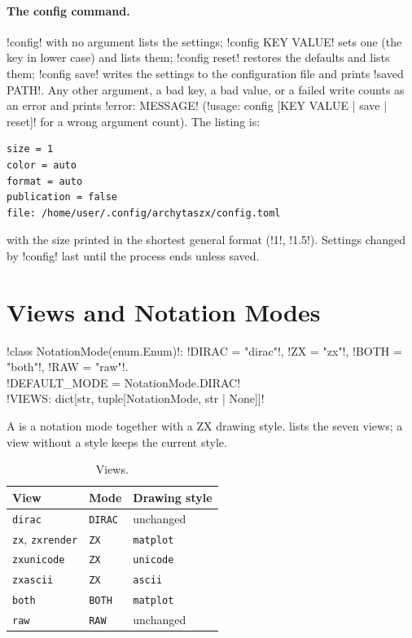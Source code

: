 \paragraph{The config command.} \azx!config! with no argument lists the settings; \azx!config KEY VALUE! sets one (the key in lower case) and lists them; \azx!config reset! restores the defaults and lists them; \azx!config save! writes the settings to the configuration file and prints \code!saved PATH!. Any other argument, a bad key, a bad value, or a failed write counts as an error and prints \code!error: MESSAGE! (\code!usage: config [KEY VALUE | save | reset]! for a wrong argument count). The listing is:
\begin{lstlisting}[style=grammar]
size = 1
color = auto
format = auto
publication = false
file: /home/user/.config/archytaszx/config.toml
\end{lstlisting}
with the size printed in the shortest general format (\code!1!, \code!1.5!). Settings changed by \azx!config! last until the process ends unless saved.

\section{Views and Notation Modes}\label{sec:shell-views}

\begin{signature}
\py!class NotationMode(enum.Enum)!: \code!DIRAC = "dirac"!, \code!ZX = "zx"!, \code!BOTH = "both"!, \code!RAW = "raw"!.\\
\py!DEFAULT_MODE = NotationMode.DIRAC!\\
\py!VIEWS: dict[str, tuple[NotationMode, str | None]]!
\end{signature}

A  is a notation mode together with a ZX drawing style.  lists the seven views; a view without a style keeps the current style.

\begin{table}[H]
\centering\small
\begin{tabular}{@{}lll@{}}
\toprule
View & Mode & Drawing style \\
\midrule
\texttt{dirac} & \texttt{DIRAC} & unchanged \\
\texttt{zx}, \texttt{zxrender} & \texttt{ZX} & \texttt{matplot} \\
\texttt{zxunicode} & \texttt{ZX} & \texttt{unicode} \\
\texttt{zxascii} & \texttt{ZX} & \texttt{ascii} \\
\texttt{both} & \texttt{BOTH} & \texttt{matplot} \\
\texttt{raw} & \texttt{RAW} & unchanged \\
\bottomrule
\end{tabular}
\caption{Views.}
\label{tab:shell-views}
\end{table}

